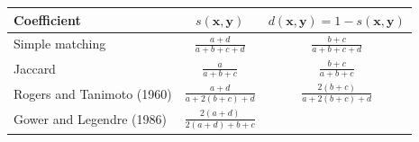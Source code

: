 \documentclass[
]{article}
\begin{document}
\begin{longtable}[]{@{}lcc@{}}
\toprule
\begin{minipage}[b]{0.26\columnwidth}\raggedright
Coefficient\strut
\end{minipage} & \begin{minipage}[b]{0.33\columnwidth}\centering
\(s(\mathbf{x},\mathbf{y})\)\strut
\end{minipage} & \begin{minipage}[b]{0.33\columnwidth}\centering
\(d(\mathbf{x},\mathbf{y})=1-s(\mathbf{x},\mathbf{y})\)\strut
\end{minipage}\tabularnewline
\midrule
\endhead
\begin{minipage}[t]{0.26\columnwidth}\raggedright
Simple matching\strut
\end{minipage} & \begin{minipage}[t]{0.33\columnwidth}\centering
\(\frac{a+d}{a+b+c+d}\)\strut
\end{minipage} & \begin{minipage}[t]{0.33\columnwidth}\centering
\(\frac{b+c}{a+b+c+d}\)\strut
\end{minipage}\tabularnewline
\begin{minipage}[t]{0.26\columnwidth}\raggedright
Jaccard\strut
\end{minipage} & \begin{minipage}[t]{0.33\columnwidth}\centering
\(\frac{a}{a+b+c}\)\strut
\end{minipage} & \begin{minipage}[t]{0.33\columnwidth}\centering
\(\frac{b+c}{a+b+c}\)\strut
\end{minipage}\tabularnewline
\begin{minipage}[t]{0.26\columnwidth}\raggedright
Rogers and Tanimoto (1960)\strut
\end{minipage} & \begin{minipage}[t]{0.33\columnwidth}\centering
\(\frac{a+d}{a+2(b+c)+d}\)\strut
\end{minipage} & \begin{minipage}[t]{0.33\columnwidth}\centering
\(\frac{2(b+c)}{a+2(b+c)+d}\)\strut
\end{minipage}\tabularnewline
\begin{minipage}[t]{0.26\columnwidth}\raggedright
Gower and Legendre (1986)\strut
\end{minipage} & \begin{minipage}[t]{0.33\columnwidth}\centering
\(\frac{2(a+d)}{2(a+d)+b+c}\)\strut
\end{minipage} & \begin{minipage}[t]{0.33\columnwidth}\centering

\end{minipage}
\end{longtable}
\end{document}
